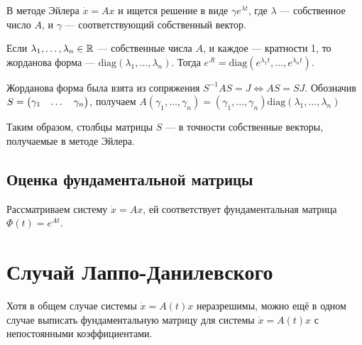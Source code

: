 \documentclass[a4paper]{report}
\begin{document}
    В методе Эйлера $\dot{x} = Ax$ и ищется решение в виде $\gamma e^{\lambda t}$, где $\lambda$ --- собственное число $A$, и $\gamma$ --- соответствующий собственный вектор.

    Если $\lambda_1, \dots, \lambda_n \in \mathbb{R}$  --- собственные числа $A$, и каждое --- кратности 1, то жорданова форма --- $\text{diag}(\lambda_1, \dots, \lambda_n)$.
    Тогда $e^{Jt} = \text{diag}\left(e^{\lambda_1 t}, \dots, e^{\lambda_n t}\right)$.

    Жорданова форма была взята из сопряжения $S^{-1} A S = J \iff A S = SJ$.
    Обозначив $S = \begin{pmatrix}\gamma_1 & \dots & \gamma_n\end{pmatrix}$, получаем $A(\gamma_1, \dots, \gamma_n) = (\gamma_1, \dots, \gamma_n)\text{diag}(\lambda_1, \dots, \lambda_n)$

    Таким образом, столбцы матрицы $S$ --- в точности собственные векторы, получаемые в методе Эйлера.

    \subsection{Оценка фундаментальной матрицы}
    Рассматриваем систему $\dot{x} = Ax$, ей соответствует фундаментальная матрица $\Phi(t) = e^{At}$.



    \section{Случай Лаппо-Данилевского}
    Хотя в общем случае системы $\dot{x} = A(t)x$ неразрешимы, можно ещё в одном случае выписать фундаментальную матрицу для системы $\dot{x} = A(t) x$ с непостоянными коэффициентами.
\end{document}
